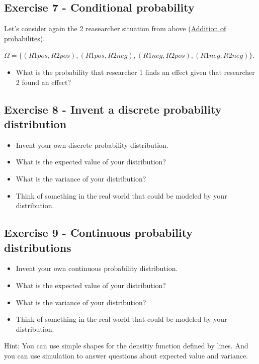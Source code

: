 \documentclass[
]{book}
\providecommand{\tightlist}{%
  \setlength{\itemsep}{0pt}\setlength{\parskip}{0pt}}
\begin{document}
\subsection{Exercise 7 - Conditional probability}\label{exercise7}

Let's consider again the 2 reasearcher situation from above (\hyperref[addition_of_probabilities]{Addition of probabilites}).

\(\Omega = \{ (R1pos, R2pos), (R1pos, R2neg), (R1neg, R2pos), (R1neg, R2neg) \}\).

\begin{itemize}
\tightlist
\item
  What is the probability that researcher 1 finds an effect given that researcher 2 found an effect?
\end{itemize}

\subsection{Exercise 8 - Invent a discrete probability distribution}\label{exercise8}

\begin{itemize}
\tightlist
\item
  Invent your own discrete probability distribution.
\item
  What is the expected value of your distribution?
\item
  What is the variance of your distribution?
\item
  Think of something in the real world that could be modeled by your distribution.
\end{itemize}

\subsection{Exercise 9 - Continuous probability distributions}\label{exercise9}

\begin{itemize}
\tightlist
\item
  Invent your own continuous probability distribution.
\item
  What is the expected value of your distribution?
\item
  What is the variance of your distribution?
\item
  Think of something in the real world that could be modeled by your distribution.
\end{itemize}

Hint: You can use simple shapes for the densitiy function defined by lines. And you can use simulation to answer questions about expected value and variance.
\end{document}
